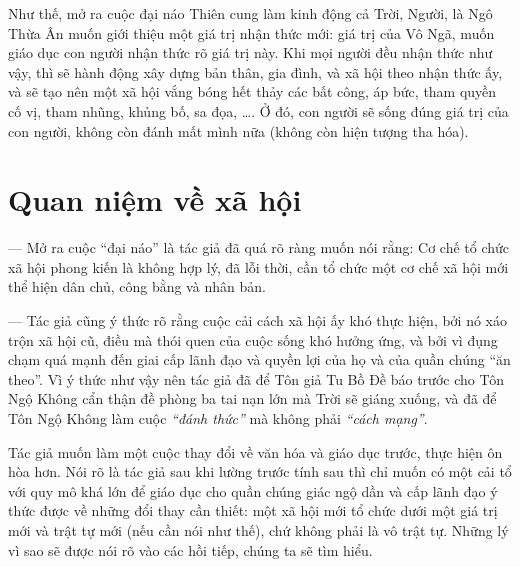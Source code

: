 Như thế, mở ra cuộc đại náo Thiên cung làm kinh động cả Trời, Người, là Ngô Thừa Ân muốn giới thiệu một giá trị nhận thức mới: giá trị của Vô Ngã, muốn giáo dục con người nhận thức rõ giá trị này. Khi mọi người đều nhận thức như vậy, thì sẽ hành động xây dựng bản thân, gia đình, và xã hội theo nhận thức ấy, và sẽ tạo nên một xã hội vắng bóng hết thảy các bất công, áp bức, tham quyền cố vị, tham nhũng, khủng bố, sa đọa, \ldots. Ở đó, con người sẽ sống đúng giá trị của con người, không còn đánh mất mình nữa (không còn hiện tượng tha hóa).


\section{Quan niệm về xã hội} %
\label{sec:4_xa_hoi}

— Mở ra cuộc ``đại náo'' là tác giả đã quá rõ ràng muốn nói rằng: Cơ chế tổ chức xã hội phong kiến là không hợp lý, đã lỗi thời, cần tổ chức một cơ chế xã hội mới thể hiện dân chủ, công bằng và nhân bản.

— Tác giả cũng ý thức rõ rằng cuộc cải cách xã hội ấy khó thực hiện, bởi nó xáo trộn xã hội cũ, điều mà thói quen của cuộc sống khó hưởng ứng, và bởi vì đụng chạm quá mạnh đến giai cấp lãnh đạo và quyền lợi của họ và của quần chúng ``ăn theo''. Vì ý thức như vậy nên tác giả đã để Tôn giả Tu Bồ Đề báo trước cho Tôn Ngộ Không cẩn thận đề phòng ba tai nạn lớn mà Trời sẽ giáng xuống, và đã để Tôn Ngộ Không làm cuộc \emph{``đánh thức''} mà không phải \emph{``cách mạng''}.

Tác giả muốn làm một cuộc thay đổi về văn hóa và giáo dục trước, thực hiện ôn hòa hơn. Nói rõ là tác giả sau khi lường trước tính sau thì chỉ muốn có một cải tổ với quy mô khá lớn để giáo dục cho quần chúng giác ngộ dần và cấp lãnh đạo ý thức được về những đổi thay cần thiết: một xã hội mới tổ chức dưới một giá trị mới và trật tự mới (nếu cần nói như thế), chứ không phải là vô trật tự. Những lý vì sao sẽ được nói rõ vào các hồi tiếp, chúng ta sẽ tìm hiểu.

